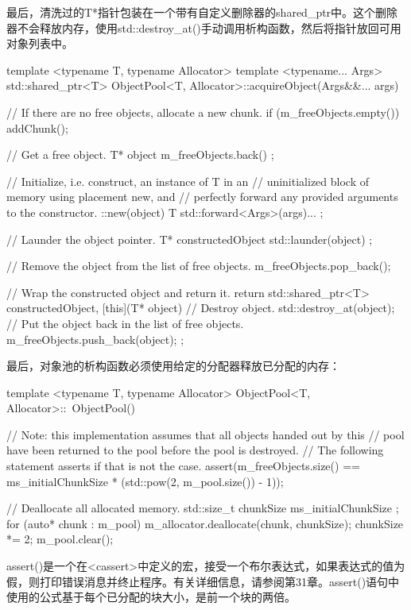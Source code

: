 最后，清洗过的T*指针包装在一个带有自定义删除器的shared\_ptr中。这个删除器不会释放内存，使用std::destroy\_at()手动调用析构函数，然后将指针放回可用对象列表中。

\begin{cpp}
template <typename T, typename Allocator>
template <typename... Args>
std::shared_ptr<T> ObjectPool<T, Allocator>::acquireObject(Args&&... args)
{
    // If there are no free objects, allocate a new chunk.
    if (m_freeObjects.empty()) { addChunk(); }

    // Get a free object.
    T* object { m_freeObjects.back() };

    // Initialize, i.e. construct, an instance of T in an
    // uninitialized block of memory using placement new, and
    // perfectly forward any provided arguments to the constructor.
    ::new(object) T { std::forward<Args>(args)... };

    // Launder the object pointer.
    T* constructedObject { std::launder(object) };

    // Remove the object from the list of free objects.
    m_freeObjects.pop_back();

    // Wrap the constructed object and return it.
    return std::shared_ptr<T> { constructedObject, [this](T* object) {
        // Destroy object.
        std::destroy_at(object);
        // Put the object back in the list of free objects.
        m_freeObjects.push_back(object);
    } };
}
\end{cpp}

最后，对象池的析构函数必须使用给定的分配器释放已分配的内存：

\begin{cpp}
template <typename T, typename Allocator>
ObjectPool<T, Allocator>::~ObjectPool()
{
    // Note: this implementation assumes that all objects handed out by this
    //       pool have been returned to the pool before the pool is destroyed.
    //       The following statement asserts if that is not the case.
    assert(m_freeObjects.size() ==
        ms_initialChunkSize * (std::pow(2, m_pool.size()) - 1));

    // Deallocate all allocated memory.
    std::size_t chunkSize { ms_initialChunkSize };
    for (auto* chunk : m_pool) {
        m_allocator.deallocate(chunk, chunkSize);
        chunkSize *= 2;
    }
    m_pool.clear();
}
\end{cpp}

assert()是一个在<cassert>中定义的宏，接受一个布尔表达式，如果表达式的值为假，则打印错误消息并终止程序。有关详细信息，请参阅第31章。assert()语句中使用的公式基于每个已分配的块大小，是前一个块的两倍。

